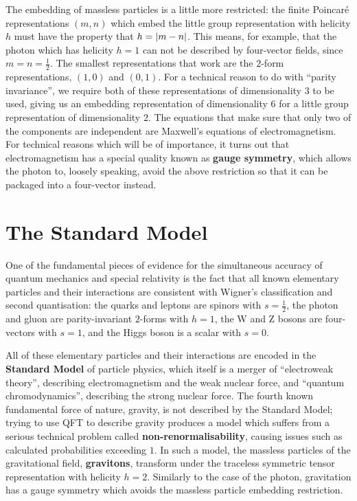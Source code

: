 \documentclass[12pt]{article}
\begin{document}
The embedding of massless particles is a little more restricted: the finite Poincaré representations $\left(m,n\right)$ which embed the little group representation with helicity $h$ must have the property that $h = \abs{m - n}$. This means, for example, that the photon which has helicity $h=1$ can not be described by four-vector fields, since $m = n = \tfrac{1}{2}$. The smallest representations that work are the $2$-form representations, $\left(1,0\right)$ and $\left(0,1\right)$. For a technical reason to do with ``parity invariance'', we require both of these representations of dimensionality $3$ to be used, giving us an embedding representation of dimensionality $6$ for a little group representation of dimensionality $2$. The equations that make sure that only two of the components are independent are Maxwell's equations of electromagnetism. For technical reasons which will be of importance, it turns out that electromagnetism has a special quality known as \textbf{gauge symmetry}, which allows the photon to, loosely speaking, avoid the above restriction so that it can be packaged into a four-vector instead.

\section{The Standard Model}

One of the fundamental pieces of evidence for the simultaneous accuracy of quantum mechanics and special relativity is the fact that all known elementary particles and their interactions are consistent with Wigner's classification and second quantisation: the quarks and leptons are spinors with $s=\tfrac{1}{2}$, the photon and gluon are parity-invariant $2$-forms with $h=1$, the W and Z bosons are four-vectors with $s=1$, and the Higgs boson is a scalar with $s=0$.
\newline

All of these elementary particles and their interactions are encoded in the \textbf{Standard Model} of particle physics, which itself is a merger of ``electroweak theory'', describing electromagnetism and the weak nuclear force, and ``quantum chromodynamics'', describing the strong nuclear force. The fourth known fundamental force of nature, gravity, is not described by the Standard Model; trying to use QFT to describe gravity produces a model which suffers from a serious technical problem called \textbf{non-renormalisability}, causing issues such as calculated probabilities exceeding $1$. In such a model, the massless particles of the gravitational field, \textbf{gravitons}, transform under the traceless symmetric tensor representation with helicity $h=2$. Similarly to the case of the photon, gravitation has a gauge symmetry which avoids the massless particle embedding restriction.
\newline
\end{document}
